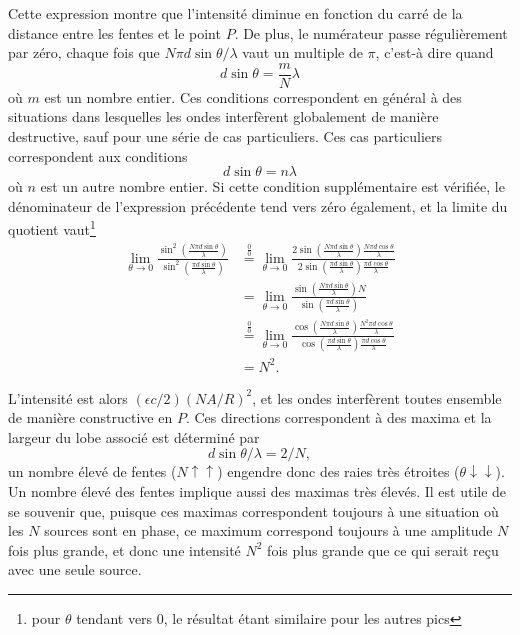 Cette expression montre que l'intensité diminue en fonction du carré de la distance entre les fentes et le point $P$. De plus, le numérateur passe régulièrement par zéro, chaque fois que $N\pi d\sin\theta/\lambda$ vaut un multiple de $\pi$, c'est-à dire quand 
$$  d\sin\theta=\frac{m}{N}\lambda$$
où $m$ est un nombre entier. Ces conditions correspondent en général à des situations dans lesquelles les ondes interfèrent globalement de manière destructive, sauf pour une série de cas particuliers. Ces cas particuliers correspondent aux conditions $$d\sin \theta=n\lambda$$
où $n$ est un autre nombre entier. Si cette condition supplémentaire est vérifiée, le dénominateur de l'expression précédente tend vers zéro également, et la limite du quotient vaut\footnote{pour $\theta$ tendant vers $0$, le résultat étant similaire pour les autres pics}
\begin{align*}
\lim\limits_{\theta \rightarrow 0}\frac{\sin^2(\frac{N\pi d\sin\theta}{\lambda})}{\sin^2(\frac{\pi d\sin\theta}{\lambda})} & \overset{\frac{0}{0}}{=}\lim\limits_{\theta \rightarrow 0}\frac{2\sin(\frac{N\pi d\sin\theta}{\lambda})\frac{N\pi d\cos\theta}{\lambda}}{2\sin(\frac{\pi d\sin\theta}{\lambda})\frac{\pi d\cos\theta}{\lambda}} \\
& =\lim\limits_{\theta \rightarrow 0}\frac{\sin(\frac{N\pi d\sin\theta}{\lambda})N}{\sin(\frac{\pi d\sin\theta}{\lambda})}\\
& \overset{\frac{0}{0}}{=}\lim\limits_{\theta \rightarrow 0}\frac{\cos(\frac{N\pi d\sin\theta}{\lambda})\frac{N^2\pi d\cos\theta}{\lambda}}{\cos(\frac{\pi d\sin\theta}{\lambda})\frac{\pi d\cos\theta}{\lambda}}\\
& = N^2.
\end{align*}

L'intensité est alors $(\epsilon c/2)(NA/R)^2$, et les ondes interfèrent toutes ensemble de manière constructive en $P$. Ces directions correspondent à des maxima et la largeur du lobe\sidenote[][-1cm]{\texttt{[image: M15]}} associé est déterminé par
$$d\sin\theta/\lambda=2/N,$$
un nombre élevé de fentes ($N\uparrow\uparrow$) engendre donc des raies très étroites ($\theta\downarrow\downarrow$). Un nombre élevé des fentes implique aussi des maximas très élevés. Il est utile de se souvenir que, puisque ces maximas correspondent toujours à une situation où les $N$ sources sont en phase, ce maximum correspond toujours à une amplitude $N$ fois plus grande, et donc une intensité $N^2$ fois plus grande que ce qui serait reçu avec une seule source.

